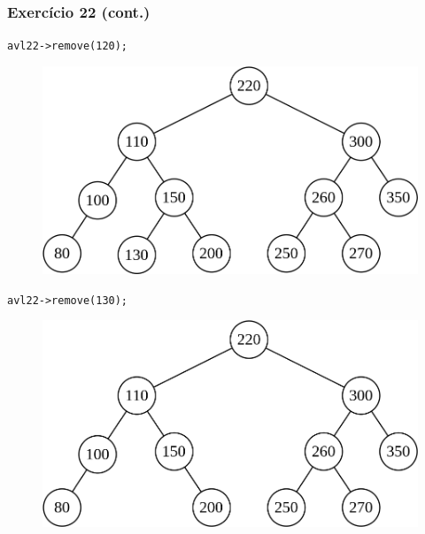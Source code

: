\documentclass[aspectratio=169]{beamer}
\begin{document}
\begin{frame}[fragile]\frametitle{Exercício 22 (cont.)}
\texttt{avl22->remove(120);}
\begin{figure}[h]
	\centering
	\includegraphics[height=0.25\paperheight]{imagens/avl-exercicio22d.png}
\end{figure}
\texttt{avl22->remove(130);}
\begin{figure}[h]
	\centering
	\includegraphics[height=0.25\paperheight]{imagens/avl-exercicio22e.png}
\end{figure}
\end{frame}
\end{document}
